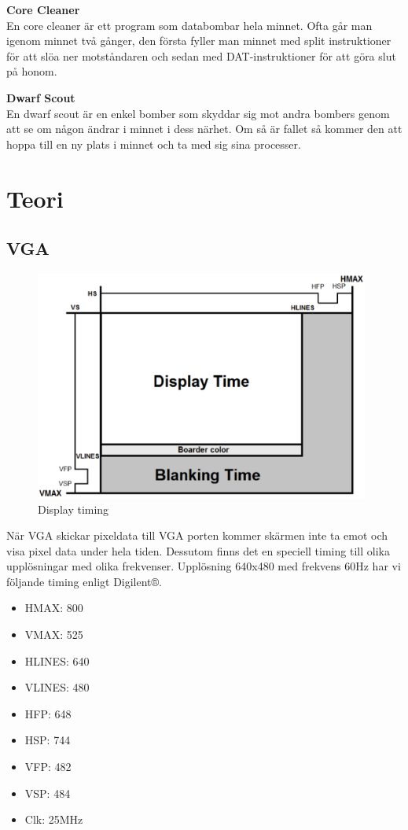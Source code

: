 \documentclass[11pt]{article}
\begin{document}
\textbf{Core Cleaner} \\
En core cleaner är ett program som databombar hela minnet. Ofta går man igenom minnet två gånger, den första fyller man minnet med split instruktioner för att slöa ner motståndaren och sedan med DAT-instruktioner för att göra slut på honom.

\textbf{Dwarf Scout} \\
En dwarf scout är en enkel bomber som skyddar sig mot andra bombers genom att se om någon ändrar i minnet i dess närhet. Om så är fallet så kommer den att hoppa till en ny plats i minnet och ta med sig sina processer.

\newpage

\section{Teori}

\subsection{VGA}

\begin{figure}[h]
    \begin{center}
        \includegraphics[width=11cm]{display_timing.eps}
        \caption{Display timing}
        \label{fig:display_timing}
    \end{center}
\end{figure}

När VGA skickar pixeldata till VGA porten kommer skärmen inte ta emot och visa pixel data under hela tiden. Dessutom finns det en speciell timing till olika upplösningar med olika frekvenser. Upplösning 640x480 med frekvens 60Hz har vi följande timing enligt Digilent®.

\begin{itemize}
    \item HMAX: 800
    \item VMAX: 525
    \item HLINES: 640
    \item VLINES: 480
    \item HFP: 648
    \item HSP: 744
    \item VFP: 482
    \item VSP: 484
    \item Clk: 25MHz
\end{itemize}
\end{document}
